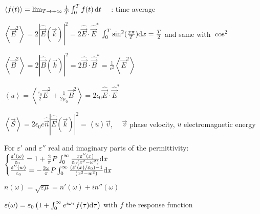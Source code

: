 
\begin{squishlist} 
\item $\left< f(t) \right> = \lim_{T \rightarrow +\infty} \frac{1}{T} \int_{0}^{T} f(t) \, \textrm{d} t \quad $ : time average

\item $\left< \vec{E}^2\right> = 2|\widehat{\vec{E}}(\vec{k})|^2 = 2\widehat{\vec{E}}\cdot\widehat{\vec{E}}^*$
\squishsep $\int_{0}^{T} \sin^2(\frac{x \pi}{T}) \textrm{d} x = \frac{T}{2}$ and same with $\cos^2$

\item $\left< \vec{B}^2\right> = 2|\widehat{\vec{B}}(\vec{k})|^2 = 2 \widehat{\vec{B}} \cdot\widehat{\vec{B}}^* = \frac{1}{c^2}\left< \vec{E}^2\right> $

\item $\left< u \right> = \left< \frac{\varepsilon_0}{2} \vec{E}^2 + \frac{1}{2\mu_0} \vec{B}^2 \right> = 2\epsilon_0 \widehat{\vec{E}}\cdot\widehat{\vec{E}}^*$

\item $\left< \vec{S} \right> = 2\epsilon_0 c \hat{\vec{n}} | \widehat{\vec{E}}(\vec{k})|^2 = \left< u\right> \vec{v}$, $\quad \vec{v}$ phase velocity, $u$ electromagnetic energy
\end{squishlist}

\begin{squishlist}
	\item For $\varepsilon'$ and $\varepsilon''$ real and imaginary parts of the permittivity:
	$\begin{cases}\frac{\varepsilon'(\omega)}{\varepsilon_0} = 1 + \frac{2}{\pi} P\int_0^{\infty} \frac{x \varepsilon''(x)}{\varepsilon_0 (x^2 - \omega^2)} \textrm{d} x \\
	\frac{\varepsilon''(w)}{\varepsilon_0} = - \frac{2 \omega}{\pi} P\int_0^{\infty} \frac{(\varepsilon'(x)/\varepsilon_0 )- 1}{(x^2 - w^2)} \textrm{d} x
	\end{cases}$

	\item $n(\omega) = \sqrt{\varepsilon \mu} = n'(\omega) + i n'' (\omega)$
	\item $\varepsilon(\omega) = \varepsilon_0 \left( 1 + \int_0^{\infty} e^{i \omega \tau} f(\tau)\textrm{d} \tau \right)$ \quad with $f$ the response function
\end{squishlist}
\columnbreak


